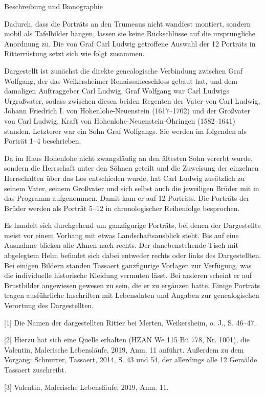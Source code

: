 \documentclass[
  letterpaper,
]{book}
\begin{document}
Beschreibung und Ikonographie

Dadurch, dass die Porträts an den Trumeaus nicht wandfest montiert,
sondern mobil als Tafelbilder hängen, lassen sie keine Rückschlüsse auf
die ursprüngliche Anordnung zu. Die von Graf Carl Ludwig getroffene
Auswahl der 12 Porträts in Ritterrüstung setzt sich wie folgt zusammen.

Dargestellt ist zunächst die direkte genealogische Verbindung zwischen
Graf Wolfgang, der das Weikersheimer Renaissanceschloss gebaut hat, und
dem damaligen Auftraggeber Carl Ludwig. Graf Wolfgang war Carl Ludwigs
Urgroßvater, sodass zwischen diesen beiden Regenten der Vater von Carl
Ludwig, Johann Friedrich I. von Hohenlohe-Neuenstein (1617--1702) und
der Großvater von Carl Ludwig, Kraft von Hohenlohe-Neuenstein-Öhringen
(1582--1641) standen. Letzterer war ein Sohn Graf Wolfgangs. Sie werden
im folgenden als Porträt 1--4 beschrieben.

Da im Haus Hohenlohe nicht zwangsläufig an den ältesten Sohn vererbt
wurde, sondern die Herrschaft unter den Söhnen geteilt und die Zuweisung
der einzelnen Herrschaften über das Los entschieden wurde, hat Carl
Ludwig zusätzlich zu seinem Vater, seinem Großvater und sich selbst auch
die jeweiligen Brüder mit in das Programm aufgenommen. Damit kam er auf
12 Porträts. Die Porträts der Brüder werden als Porträt 5--12 in
chronologischer Reihenfolge besprochen.

Es handelt sich durchgehend um ganzfigurige Porträts, bei denen der
Dargestellte meist vor einem Vorhang mit etwas Landschaftsausblick
steht. Bis auf eine Ausnahme blicken alle Ahnen nach rechts. Der
danebenstehende Tisch mit abgelegtem Helm befindet sich dabei entweder
rechts oder links des Dargestellten. Bei einigen Bildern standen
Tassaert ganzfigurige Vorlagen zur Verfügung, was die individuelle
historische Kleidung vermuten lässt. Bei anderen scheint er auf
Brustbilder angewiesen gewesen zu sein, die er zu ergänzen hatte. Einige
Porträts tragen ausführliche Inschriften mit Lebensdaten und Angaben zur
genealogischen Verortung des Dargestellten.

{[}1{]} Die Namen der dargestellten Ritter bei Merten, Weikersheim, o.
J., S. 46--47.

{[}2{]} Hierzu hat sich eine Quelle erhalten (HZAN We 115 Bü 778, Nr.
1001), die Valentin, Malerische Lebensläufe, 2019, Anm. 11 anführt.
Außerdem zu dem Vorgang: Schnurrer, Tassaert, 2014, S. 43 und 54, der
allerdings alle 12 Gemälde Tassaert zuschreibt.

{[}3{]} Valentin, Malerische Lebensläufe, 2019, Anm. 11.
\end{document}
